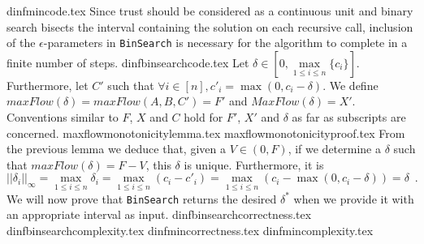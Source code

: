   {dinfmincode.tex}
  Since trust should be considered as a continuous unit and binary search bisects the interval containing the solution
  on each recursive call, inclusion of the $\epsilon$-parameters in \texttt{BinSearch} is necessary for the algorithm to
  complete in a finite number of steps.
  {dinfbinsearchcode.tex}
  Let $\delta \in \left[0, \max\limits_{1 \leq i \leq n}{\{c_i\}}\right]$. Furthermore, let $C'$ such that
  $\forall i \in \left[n\right], c'_i = \max{\left(0, c_i - \delta\right)}$. We define $maxFlow\left(\delta\right) = 
  maxFlow\left(A, B, C'\right) = F'$ and $MaxFlow\left(\delta\right) = X'$. Conventions similar to $F$, $X$ and $C$ hold
  for $F'$, $X'$ and $\delta$ as far as subscripts are concerned.
  {maxflowmonotonicitylemma.tex}
  {maxflowmonotonicityproof.tex}
  From the previous lemma we deduce that, given a $V \in \left(0, F\right)$, if we determine a $\delta$ such that
  $maxFlow\left(\delta\right) = F - V$, this $\delta$ is unique. Furthermore, it is
  \begin{equation*}
    ||\delta_i||_\infty = \max\limits_{1 \leq i \leq n}{\delta_i} = \max\limits_{1 \leq i \leq n}{\left(c_i - c'_i\right)} =
    \max\limits_{1 \leq i \leq n}{\left(c_i - \max{\left(0, c_i - \delta\right)}\right)} = \delta \enspace.
  \end{equation*}
  We will now prove that \texttt{BinSearch} returns the desired $\delta^*$ when we provide it with an appropriate interval
  as input.
  {dinfbinsearchcorrectness.tex}
  {dinfbinsearchcomplexity.tex}
  {dinfmincorrectness.tex}
  {dinfmincomplexity.tex}

